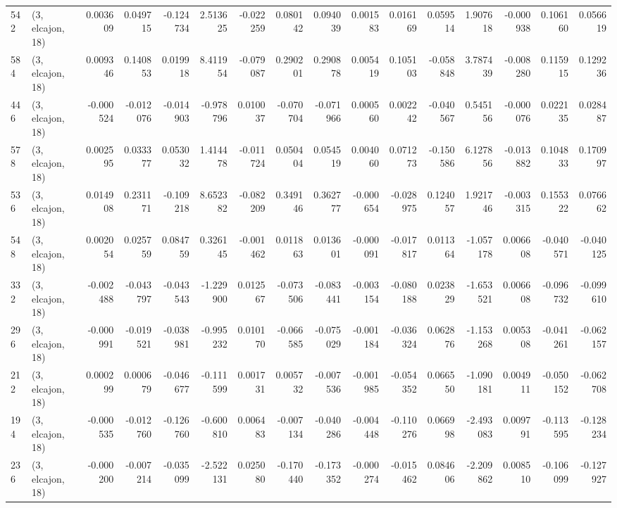 \begin{tabular}{llrrrrrrrrrrrrrr}
542 &  (3, elcajon, 18) &   0.003609 &  0.049715 & -0.124734 &    2.513625 & -0.022259 &   0.080142 &   0.094039 &  0.001583 &  0.016169 &  0.059514 &    1.907618 & -0.000938 &   0.106160 &   0.056619 \\
584 &  (3, elcajon, 18) &   0.009346 &  0.140853 &  0.019918 &    8.411954 & -0.079087 &   0.290201 &   0.290878 &  0.005419 &  0.105103 & -0.058848 &    3.787439 & -0.008280 &   0.115915 &   0.129236 \\
446 &  (3, elcajon, 18) &  -0.000524 & -0.012076 & -0.014903 &   -0.978796 &  0.010037 &  -0.070704 &  -0.071966 &  0.000560 &  0.002242 & -0.040567 &    0.545156 & -0.000076 &   0.022135 &   0.028487 \\
578 &  (3, elcajon, 18) &   0.002595 &  0.033377 &  0.053032 &    1.414478 & -0.011724 &   0.050404 &   0.054519 &  0.004060 &  0.071273 & -0.150586 &    6.127856 & -0.013882 &   0.104833 &   0.170997 \\
536 &  (3, elcajon, 18) &   0.014908 &  0.231171 & -0.109218 &    8.652382 & -0.082209 &   0.349146 &   0.362777 & -0.000654 & -0.028975 &  0.124057 &    1.921746 & -0.003315 &   0.155322 &   0.076662 \\
548 &  (3, elcajon, 18) &   0.002054 &  0.025759 &  0.084759 &    0.326145 & -0.001462 &   0.011863 &   0.013601 & -0.000091 & -0.017817 &  0.011364 &   -1.057178 &  0.006608 &  -0.040571 &  -0.040125 \\
332 &  (3, elcajon, 18) &  -0.002488 & -0.043797 & -0.043543 &   -1.229900 &  0.012567 &  -0.073506 &  -0.083441 & -0.003154 & -0.080188 &  0.023829 &   -1.653521 &  0.006608 &  -0.096732 &  -0.099610 \\
296 &  (3, elcajon, 18) &  -0.000991 & -0.019521 & -0.038981 &   -0.995232 &  0.010170 &  -0.066585 &  -0.075029 & -0.001184 & -0.036324 &  0.062876 &   -1.153268 &  0.005308 &  -0.041261 &  -0.062157 \\
212 &  (3, elcajon, 18) &   0.000299 &  0.000679 & -0.046677 &   -0.111599 &  0.001731 &   0.005732 &  -0.007536 & -0.001985 & -0.054352 &  0.066550 &   -1.090181 &  0.004911 &  -0.050152 &  -0.062708 \\
194 &  (3, elcajon, 18) &  -0.000535 & -0.012760 & -0.126760 &   -0.600810 &  0.006483 &  -0.007134 &  -0.040286 & -0.004448 & -0.110276 &  0.066998 &   -2.493083 &  0.009791 &  -0.113595 &  -0.128234 \\
236 &  (3, elcajon, 18) &  -0.000200 & -0.007214 & -0.035099 &   -2.522131 &  0.025080 &  -0.170440 &  -0.173352 & -0.000274 & -0.015462 &  0.084606 &   -2.209862 &  0.008510 &  -0.106099 &  -0.127927 \\

\end{tabular}
